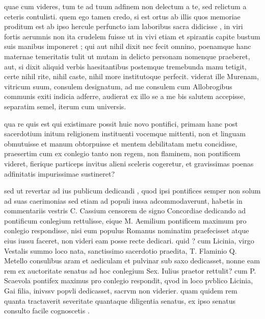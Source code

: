  quae cum videres, tum te ad tuum adfinem non delectum a te, sed relictum a ceteris contulisti. quem ego tamen credo, si est ortus ab illis quos memoriae proditum est ab ipso hercule perfuncto iam laboribus sacra didicisse , in viri fortis aerumnis non ita crudelem fuisse ut in vivi etiam et spirantis capite bustum suis manibus imponeret ; qui aut nihil dixit nec fecit omnino, poenamque hanc maternae temeritatis tulit ut mutam in delicto personam nomenque praeberet, aut, si dixit aliquid verbis haesitantibus postemque tremebunda manu tetigit, certe nihil rite, nihil caste, nihil more institutoque perfecit. viderat ille Murenam, vitricum suum, consulem designatum, ad me consulem cum Allobrogibus communis exiti indicia adferre, audierat ex illo se a me bis salutem accepisse, separatim semel, iterum cum universis.

 qua re quis est qui existimare possit huic novo pontifici, primam hanc post sacerdotium initum religionem instituenti vocemque mittenti, non et linguam obmutuisse et manum obtorpuisse et mentem debilitatam metu concidisse, praesertim cum ex conlegio tanto non regem, non flaminem, non pontificem videret, fierique particeps invitus alieni sceleris cogeretur, et gravissimas poenas adfinitatis impurissimae sustineret?

 sed ut revertar ad ius publicum dedicandi , quod ipsi pontifices semper non solum ad suas caerimonias sed etiam ad populi iussa adcommodaverunt, habetis in commentariis vestris C. Cassium censorem de signo Concordiae dedicando ad pontificum conlegium rettulisse, eique M. Aemilium pontificem maximum pro conlegio respondisse, nisi eum populus Romanus nominatim praefecisset atque eius iussu faceret, non videri eam posse recte dedicari. quid ? cum Licinia, virgo Vestalis summo loco nata, sanctissimo sacerdotio praedita, T. Flaminio Q. Metello consulibus aram et aediculam et pulvinar sub saxo dedicasset, nonne eam rem ex auctoritate senatus ad hoc conlegium Sex. Iulius praetor rettulit? cum P. Scaevola pontifex maximus pro conlegio respondit, qvod in loco pvblico Licinia, Gai filia, inivssv popvli dedicasset, sacrvm non viderier. quam quidem rem quanta tractaverit severitate quantaque diligentia senatus, ex ipso senatus consulto facile cognoscetis .

